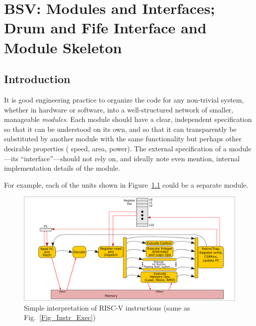 

\chapter{BSV: Modules and Interfaces; \\
Drum and Fife Interface and Module Skeleton}


\setcounter{page}{1}
\renewcommand{\thepage}{\arabic{chapter}-\arabic{page}}

\label{ch_Module_Skeleton}


\section{Introduction}

It is good engineering practice to organize the code for any
non-trivial system, whether in hardware or software, into a
well-structured network of smaller, manageable \emph{modules}.  Each
module should have a clear, independent specification so that it can
be understood on its own, and so that it can transparently be
substituted by another module with the same functionality but perhaps
other desirable properties ({\eg} speed, area, power).  The external
specification of a module---its ``interface''---should not rely on,
and ideally note even mention, internal implementation details of the
module.

For example, each of the units shown in
Figure~\ref{Fig_CPU_Module_Skeleton_Simple_Instr_Exec} could be a
separate module.
\begin{figure}[htbp]
  \centerline{\includegraphics[width=6in,angle=0]{ch030_RISCV_Design_Space/Figures/Fig_Instr_Exec}}
  \caption{\label{Fig_CPU_Module_Skeleton_Simple_Instr_Exec}Simple interpretation of RISC-V instructions (same as Fig.~\ref{Fig_Instr_Exec})}
\end{figure}

